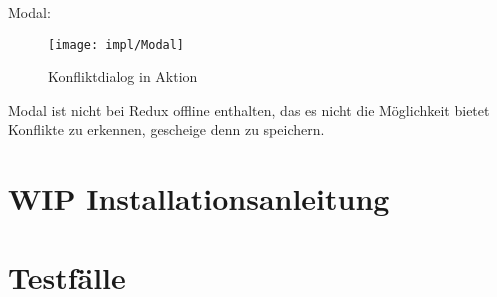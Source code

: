 \begin{center}
  
\end{center}

Modal:
\begin{figure}[H]
  \centering
  \texttt{[image: impl/Modal]}
  \grayRule
  \caption{Konfliktdialog in Aktion}
  \label{fig:modal}
\end{figure}
Modal ist nicht bei Redux offline enthalten, das es nicht die Möglichkeit bietet Konflikte zu erkennen, gescheige denn zu speichern.
%
%
%
%
%
\section{WIP Installationsanleitung}


%
%
\section{\label{chap:impl:test}Testfälle}
